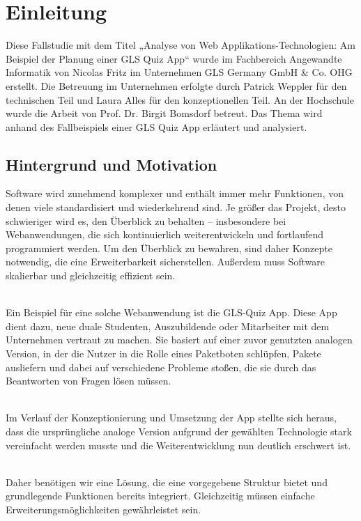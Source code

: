 \documentclass[biblatex]{lni}
\begin{document}
\section{Einleitung}
Diese Fallstudie mit dem Titel „Analyse von Web Applikations-Technologien: Am Beispiel der Planung einer GLS Quiz App“
wurde im Fachbereich Angewandte Informatik von Nicolas Fritz im Unternehmen GLS Germany GmbH & Co. OHG erstellt.
Die Betreuung im Unternehmen erfolgte durch Patrick Weppler für den technischen Teil und Laura Alles für den konzeptionellen Teil.
An der Hochschule wurde die Arbeit von Prof. Dr. Birgit Bomsdorf betreut.
Das Thema wird anhand des Fallbeispiels einer GLS Quiz App erläutert und analysiert.

\subsection{Hintergrund und Motivation}
Software wird zunehmend komplexer und enthält immer mehr Funktionen, von denen viele standardisiert und wiederkehrend sind.
Je größer das Projekt, desto schwieriger wird es, den Überblick zu behalten – insbesondere bei Webanwendungen,
die sich kontinuierlich weiterentwickeln und fortlaufend programmiert werden.
Um den Überblick zu bewahren, sind daher Konzepte notwendig, die eine Erweiterbarkeit sicherstellen.
Außerdem muss Software skalierbar und gleichzeitig effizient sein.

\\

Ein Beispiel für eine solche Webanwendung ist die GLS-Quiz App.
Diese App dient dazu, neue duale Studenten, Auszubildende oder Mitarbeiter mit dem Unternehmen vertraut zu machen.
Sie basiert auf einer zuvor genutzten analogen Version, in der die Nutzer in die Rolle eines Paketboten schlüpfen,
Pakete ausliefern und dabei auf verschiedene Probleme stoßen, die sie durch das Beantworten von Fragen lösen müssen.

\\

Im Verlauf der Konzeptionierung und Umsetzung der App stellte sich heraus,
dass die ursprüngliche analoge Version aufgrund der gewählten Technologie stark vereinfacht werden musste
und die Weiterentwicklung nun deutlich erschwert ist.

\\

Daher benötigen wir eine Lösung,
die eine vorgegebene Struktur bietet und grundlegende Funktionen bereits integriert.
Gleichzeitig müssen einfache Erweiterungsmöglichkeiten gewährleistet sein.
\end{document}

